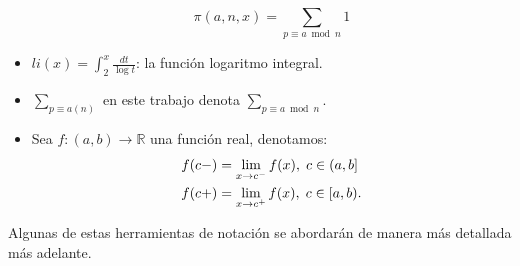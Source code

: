 \begin{itemize}[label=$\bullet$]
$$\pi(a,n,x)=\sum_{p\equiv a\bmod{n}}1$$

\item $li(x)=\displaystyle\int_2^x\frac{dt}{\log t}$: la función logaritmo integral.

\item $\displaystyle\sum_{p\equiv a (n)}$ en este trabajo denota $\displaystyle\sum_{p\equiv a \bmod{n}}$.

\item Sea $f:(a,b) \longrightarrow \mathbb{R}$ una función real, denotamos:
   \begin{align*}
       f(c-)&=\lim_{x \rightarrow c^-} f(x), \hspace{0.1cm} c \in (a,b] \notag \\
       f(c+)&=\lim_{x \rightarrow c^+} f(x), \hspace{0.1cm} c \in [a,b).
   \end{align*}
\end{itemize}

\begin{note}
Algunas de estas herramientas de notación se abordarán de manera más detallada más adelante.
\end{note}

\begin{comment}
En el capítulo 1 presentaremos algunos preliminares que se pueden consultar en el contenido y estudiaremos un poco la función $\zeta(s)$ y su derivada logarítmica $\dfrac{\zeta^{\prime}(s)}{\zeta(s)}$, veremos que el TNP es equivalente a la afirmación $\psi(x)\thicksim x$, función que también estudiaremos allí. El capítulo 2 será para presentar una prueba del teorema de Dirichlet, las ideas subyacentes y los preliminares de la  prueba también se desarrollarán allí, en los capítulos 3 y 4 se desarrollarán las pruebas del TNP y el TNP sobre progresiones aritmética, estudiaremos la teoría Tauberiana, que nos permitirá dar una prueba sencilla del TNP y donde casi toda  la variable compleja estará escondida en el teorema de Wiener-Ikehara que también presentaremos allí junto con algunas aplicaciones.
\end{comment}
